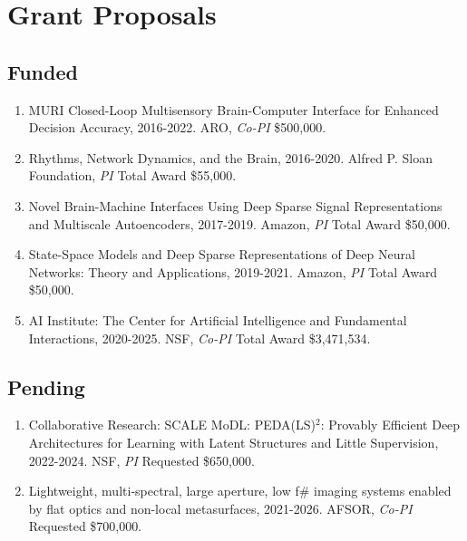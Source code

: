 \section*{Grant Proposals}

\subsection*{Funded}

\begin{enumerate}
  \item MURI Closed-Loop Multisensory Brain-Computer Interface for Enhanced Decision Accuracy, 2016-2022. ARO, \textit{Co-PI} {\$}500,000.
  \item Rhythms, Network Dynamics, and the Brain, 2016-2020. Alfred P. Sloan Foundation, \textit{PI} Total Award {\$}55,000.  
  \item Novel Brain-Machine Interfaces Using Deep Sparse Signal Representations and Multiscale Autoencoders, 2017-2019. Amazon, \textit{PI} Total Award {\$}50,000.
    \item State-Space Models and Deep Sparse Representations of Deep Neural Networks: Theory and Applications, 2019-2021. Amazon, \textit{PI} Total Award {\$}50,000.
	\item AI Institute: The Center for Artificial Intelligence and Fundamental Interactions, 2020-2025. NSF, \textit{Co-PI} Total Award {\$}3,471,534.
\end{enumerate}

\subsection*{Pending}

\begin{enumerate}
    \item Collaborative Research: SCALE MoDL: PEDA(LS)$^\text{2}$: Provably Efficient Deep Architectures for Learning with Latent Structures and Little Supervision, 2022-2024. NSF, \textit{PI} Requested \$650,000.
    \item Lightweight, multi-spectral, large aperture, low f\# imaging systems enabled by flat optics and non-local metasurfaces, 2021-2026. AFSOR, \textit{Co-PI} Requested \$700,000.
\end{enumerate}

